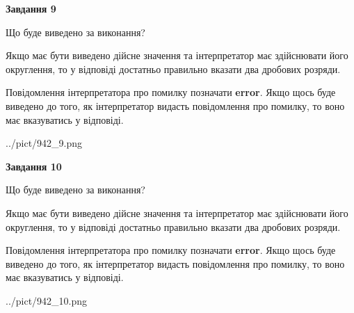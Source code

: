 \documentclass[12pt, ukrainian]{article}
\begin{document}
{\begin {Large}
{\begin {center}\textbf{Завдання 9}\end {center}}\par
Що буде виведено за виконання? \par

Якщо має бути виведено дійсне значення та інтерпретатор має здійснювати його округлення, 
то у відповіді достатньо правильно вказати два дробових розряди.

Повідомлення інтерпретатора про помилку позначати \textbf{error}.
Якщо щось буде виведено до того, як інтерпретатор видасть повідомлення про помилку, 
то воно має вказуватись у відповіді. \par

\begin{center}
	{../pict/942_9.png}
\end{center}
\newpage

{\begin {center}\textbf{Завдання 10}\end {center}}\par
Що буде виведено за виконання? \par

Якщо має бути виведено дійсне значення та інтерпретатор має здійснювати його округлення, 
то у відповіді достатньо правильно вказати два дробових розряди.

Повідомлення інтерпретатора про помилку позначати \textbf{error}.
Якщо щось буде виведено до того, як інтерпретатор видасть повідомлення про помилку, 
то воно має вказуватись у відповіді. \par

\begin{center}
	{../pict/942_10.png}
\end{center}
\newpage

\end {Large}}
\end{document}
